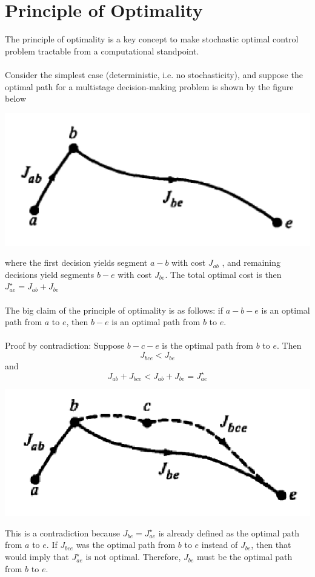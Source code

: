 \documentclass[twoside]{article}
\begin{document}
 
\section{Principle of Optimality}
The principle of optimality is a key concept to make stochastic optimal control problem tractable from a computational standpoint. \\
\\
Consider the simplest case (deterministic, i.e. no stochasticity), and suppose the optimal path for a multistage decision-making problem is shown by the figure below
\begin{center}
\includegraphics[width=0.5 \textwidth]{image1.png}
\end{center}
where the first decision yields segment $a-b$ with cost $J_{ab}$ , and remaining decisions yield segments $b-e$ with cost $J_{be}$. The total optimal cost is then $J^{\star}_{ae} = J_{ab} + J_{be}$\\
\\
The big claim of the principle of optimality is as follows: if $a-b-e$ is an optimal path from $a$ to $e$, then $b-e$ is an optimal path from $b$ to $e$.
\\
\\
Proof by contradiction: Suppose $b-c-e$ is the optimal path from $b$ to $e$. Then
$$J_{bce} < J_{be}$$
and
$$J_{ab} + J_{bce} < J_{ab} + J_{be}=J^{\star}_{ae}$$
\begin{center}
\includegraphics[width=0.5 \textwidth]{image2.png}
\end{center}
This is a contradiction because $J_{be}=J^{\star}_{ae}$ is already defined as the optimal path from $a$ to $e$. If $J_{bce}$ was the optimal path from $b$ to $e$ instead of $J_{be}$, then that would imply that $J^{\star}_{ae}$ is not optimal. Therefore, $J_{be}$ must be the optimal path from $b$ to $e$. \\
\\
\end{document}
